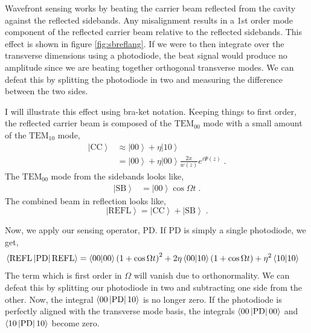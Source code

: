 Wavefront sensing works by beating the carrier beam reflected from the cavity
against the reflected sidebands.
Any misalignment results in a 1st order mode component of the reflected carrier
beam relative to the reflected sidebands.
This effect is shown in figure \ref{fig:sbreflang}.
If we were to then integrate over the transverse dimensions using a photodiode,
the beat signal would produce no amplitude since we are beating together
orthogonal transverse modes.
We can defeat this by splitting the photodiode in two and measuring the
difference between the two sides.

I will illustrate this effect using bra-ket notation.
Keeping things to first order, the reflected carrier beam is composed of the
$\mathrm{TEM}_{00}$ mode with a small amount of the $\mathrm{TEM}_{10}$ mode,
\begin{align}
  \left| \mathrm{CC} \right\rangle &\approx \left| 00 \right\rangle + \eta
    \left| 10 \right\rangle \\
  &= \left| 00 \right\rangle + \eta \left| 00 \right\rangle \frac{2x}{w(z)}
    e^{i\Psi(z)} \; .
\end{align}
The $\mathrm{TEM}_{00}$ mode from the sidebands looks like,
\begin{align}
  \left| \mathrm{SB} \right\rangle &= \left| 00 \right\rangle \cos
    \Omega t \; .
\end{align}
The combined beam in reflection looks like,
\begin{equation}
  \left| \mathrm{REFL} \right\rangle = \left| \mathrm{CC} \right\rangle +
    \left| \mathrm{SB} \right\rangle \; .
\end{equation}

Now, we apply our sensing operator, $\mathrm{PD}$. If $\mathrm{PD}$ is simply
a single photodiode, we get,
\begin{align}
  \left\langle \mathrm{REFL} \left| \mathrm{PD} \right| \mathrm{REFL}
  \right\rangle &= \left\langle 00 | 00 \right\rangle
    \left( 1 + \cos \Omega t \right)^2 +
    2\eta \left\langle 00 | 10 \right\rangle \left(1 + \cos \Omega t \right) +
    \eta^2 \left\langle 10 | 10 \right\rangle
\end{align}
The term which is first order in $\Omega$ will vanish due to orthonormality.
We can defeat this by splitting our photodiode in two and subtracting one side
from the other.
Now, the integral $\left\langle 00 \left| \mathrm{PD} \right| 10 \right\rangle$ is no longer zero.
If the photodiode is perfectly aligned with the transverse mode basis,
the integrals $\left\langle 00 \left| \mathrm{PD} \right| 00 \right\rangle$ and
$\left\langle 10 \left| \mathrm{PD} \right| 10 \right\rangle$ become zero.

